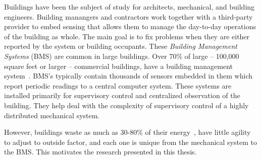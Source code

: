Buildings have been the subject of study for architects, mechanical, and building engineers.  Building manangers
and contractors work together with a third-party provider to embed sensing that allows them to manage
the day-to-day operations of the building as whole.  The main goal is to fix problems when they are either reported
by the system or building occupants.  These \emph{Building Management Systems} (BMS) are common in large buildings.
Over 70\% of large -- 100,000 square feet or larger -- commercial buildings, have a building management 
system~\cite{cbecs2003}.  BMS's typically contain thousands of sensors embedded in them which report periodic readings to 
a central computer system.  These systems are installed primarily for supervisory control and
centralized observation of the building.  
They help deal with the complexity of supervisory control of a highly distributed mechanical system.

However, buildings waste as much as 30-80\% of their energy~\cite{waste_science, next10_waste}, have little agility
to adjust to outside factor, and each one is unique from the mechanical system to the BMS.  This motivates
the research presented in this thesis.  






